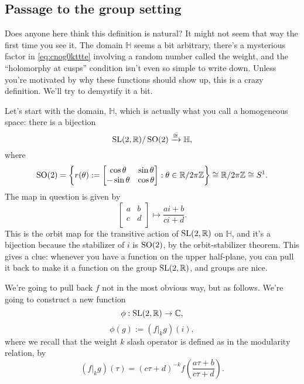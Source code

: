 \documentclass[reqno]{amsart} 
\begin{document}
\subsection{Passage to the group setting}

Does anyone here think this definition is natural?  It might not seem that way the first time you see it.  The domain $\mathbb{H}$ seems a bit arbitrary, there's a mysterious factor in \eqref{eq:cnog0kttte} involving a random number called the weight, and the ``holomorphy at cusps'' condition isn't even so simple to write down.  Unless you're motivated by why these functions should show up, this is a crazy definition.  We'll try to demystify it a bit.

Let's start with the domain, $\mathbb{H}$, which is actually what you call a homogeneous space: there is a bijection
\begin{equation*}
  \operatorname{SL}(2,\mathbb{R}) / \operatorname{SO}(2) \xrightarrow{\cong} \mathbb{H},
\end{equation*}
where
\begin{equation*}
  \operatorname{SO}(2) = \left\{
    {
      r(\theta)
    }
    :=
    \begin{bmatrix}
      \cos \theta      &  \sin \theta \\
      - \sin \theta                       & \cos \theta \\
    \end{bmatrix} : \theta \in \mathbb{R} / 2 \pi \mathbb{Z} \right\}
  \cong \mathbb{R} / 2 \pi \mathbb{Z} \cong S^1.
\end{equation*}
The map in question is given by
\begin{equation*}
  \begin{bmatrix}
    a    & b \\
    c & d \\
  \end{bmatrix}
  \mapsto \frac{a i + b}{c i + d}.  
\end{equation*}
This is the orbit map for the transitive action of $\operatorname{SL}(2,\mathbb{R})$ on $\mathbb{H}$, and it's a bijection because the stabilizer of $i$ is $\operatorname{SO}(2)$, by the orbit-stabilizer theorem.  This gives a clue: whenever you have a function on the upper half-plane, you can pull it back to make it a function on the group $\operatorname{SL}(2,\mathbb{R})$, and groups are nice.

We're going to pull back $f$ not in the most obvious way, but as follows.  We're going to construct a new function
\begin{equation*}
  \phi : \operatorname{SL}(2,\mathbb{R}) \rightarrow \mathbb{C},
\end{equation*}
\begin{equation*}
  \phi(g) :=  (f|_k g)(i),
\end{equation*}
where we recall that the weight $k$ slash operator is defined as in the modularity relation, by
\begin{equation*}
  (f |_k g)(\tau) =(c \tau + d)^{- k} f \left( \frac{a \tau + b}{c \tau + d} \right).
\end{equation*}
\end{document}
